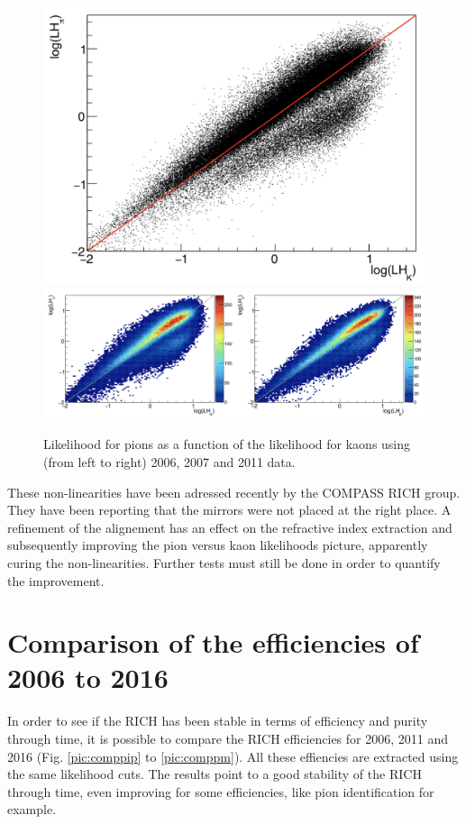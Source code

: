 \begin{figure}[!h]
  \centering
	\includegraphics[scale=0.2]{./gfx/RICHLH2006.png}
  \includegraphics[scale=0.3]{./gfx/RICHLH2011.png}
	\caption{Likelihood for pions as a function of the likelihood for kaons using (from left to right) 2006, 2007 and 2011 data.}
	\label{pic:K0sample}
\end{figure}

These non-linearities have been adressed recently by the COMPASS RICH group. They have been reporting that the mirrors were not placed at the right place. A refinement of the alignement has an effect on the refractive index extraction and subsequently improving the pion versus kaon likelihoods picture, apparently curing the non-linearities. Further tests must still be done in order to quantify the improvement.

\section{Comparison of the efficiencies of 2006 to 2016}

In order to see if the RICH has been stable in terms of efficiency and purity through time, it is possible to compare the RICH efficiencies for 2006, 2011 and 2016 (Fig. \ref{pic:comppip} to \ref{pic:comppm}). All these effiencies are extracted using the same likelihood cuts. The results point to a good stability of the RICH through time, even improving for some efficiencies, like pion identification for example.

